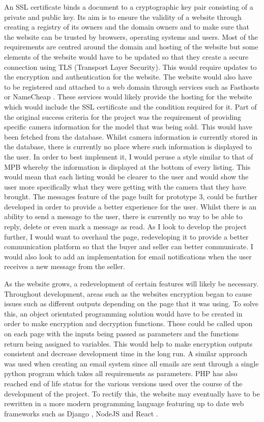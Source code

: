 An SSL certificate binds a document to a cryptographic key pair consisting of a private and public key. Its aim is to ensure the validity of a website through creating a registry of its owners and the domain owners and to make sure that the website can be trusted by browsers, operating systems and users. Most of the requirements are centred around the domain and hosting of the website but some elements of the website would have to be updated so that they create a secure connection using TLS (Transport Layer Security). This would require updates to the encryption and authentication for the website. The website would also have to be registered and attached to a web domain through services such as Fasthosts \parencite{fasthost} or NameCheap \parencite{namecheap}. These services would likely provide the hosting for the website which would include the SSL certificate and the condition required for it.
Part of the original success criteria for the project was the requirement of providing specific camera information for the model that was being sold. This would have been fetched from the database. Whilst camera information is currently stored in the database, there is currently no place where such information is displayed to the user. In order to best implement it, I would peruse a style similar to that of MPB \parencite{mpb} whereby the information is displayed at the bottom of every listing. This would mean that each listing would be clearer to the user and would show the user more specifically what they were getting with the camera that they have brought. 
The messages feature of the page built for prototype 3, could be further developed in order to provide a better experience for the user. Whilst there is an ability to send a message to the user, there is currently no way to be able to reply, delete or even mark a message as read. As I look to develop the project further, I would want to overhaul the page, redeveloping it to provide a better communication platform so that the buyer and seller can better communicate. I would also look to add an implementation for email notifications when the user receives a new message from the seller. 

As the website grows, a redevelopment of certain features will likely be necessary. Throughout development, areas such as the websites encryption began to cause issues such as different outputs depending on the page that it was using. To solve this, an object orientated programming solution would have to be created in order to make encryption and decryption functions. These could be called upon on each page with the inputs being passed as parameters and the functions return being assigned to variables. This would help to make encryption outputs consistent and decrease development time in the long run. A similar approach was used when creating an email system since all emails are sent through a single python program which takes all requirements as parameters. PHP has also reached end of life status \parencite{php_versions} for the various versions used over the course of the development of the project. To rectify this, the website may eventually have to be rewritten in a more modern programming language featuring up to date web frameworks such as Django \parencite{django}, NodeJS \parencite{nodejs} and React \parencite{meta_platforms_react}.
